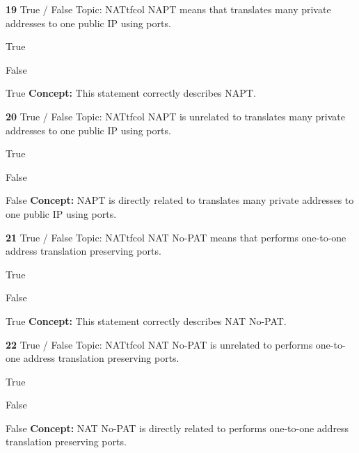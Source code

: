 \documentclass[10pt,a4paper]{article}
\begin{document}
\begin{qcard}{\color{white}\textbf{19} \hfill \small True / False \textbar{} Topic: NAT}{tfcol}
NAPT means that translates many private addresses to one public IP using ports.

\begin{qoptions}
\item True
\item False
\end{qoptions}
\begin{explainbox}{True}
\textbf{Concept:} This statement correctly describes NAPT.
\end{explainbox}
\end{qcard}

\begin{qcard}{\color{white}\textbf{20} \hfill \small True / False \textbar{} Topic: NAT}{tfcol}
NAPT is unrelated to translates many private addresses to one public IP using ports.

\begin{qoptions}
\item True
\item False
\end{qoptions}
\begin{explainbox}{False}
\textbf{Concept:} NAPT is directly related to translates many private addresses to one public IP using ports.
\end{explainbox}
\end{qcard}

\begin{qcard}{\color{white}\textbf{21} \hfill \small True / False \textbar{} Topic: NAT}{tfcol}
NAT No-PAT means that performs one-to-one address translation preserving ports.

\begin{qoptions}
\item True
\item False
\end{qoptions}
\begin{explainbox}{True}
\textbf{Concept:} This statement correctly describes NAT No-PAT.
\end{explainbox}
\end{qcard}

\begin{qcard}{\color{white}\textbf{22} \hfill \small True / False \textbar{} Topic: NAT}{tfcol}
NAT No-PAT is unrelated to performs one-to-one address translation preserving ports.

\begin{qoptions}
\item True
\item False
\end{qoptions}
\begin{explainbox}{False}
\textbf{Concept:} NAT No-PAT is directly related to performs one-to-one address translation preserving ports.
\end{explainbox}
\end{qcard}
\end{document}
